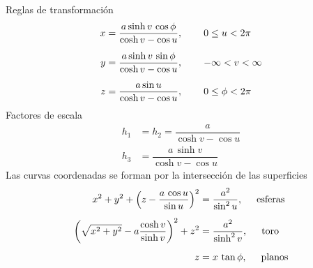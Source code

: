 \documentclass[hidelinks,12pt]{article}
\begin{document}
Reglas de transformación
\begin{align*}
    x &= \dfrac{a \sinh v \, \cos \phi}{\cosh v - \cos u}, \hspace{0.75cm} 0 \leq u < 2 \pi \\[0.5em]
    y &= \dfrac{a \sinh v \, \sin \phi}{\cosh v - \cos u}, \hspace{0.75cm} -\infty < v < \infty \\[0.5em]
    z &= \dfrac{a \sin u}{\cosh v - \cos u}, \hspace{0.75cm} 0 \leq \phi < 2 \pi
\end{align*}
Factores de escala
\begin{align*}
    h_{1} &= h_{2} = \dfrac{a}{\cosh v - \cos u} \\[0.5em]
    h_{3} &= \dfrac{a \, \sinh v}{\cosh v - \cos u}
\end{align*}
Las curvas coordenadas se forman por la intersección de las superficies
\begin{align*}
    x^{2} + y^{2} + \left( z - \dfrac{a \, \cos u}{\sin u} \right)^{2} &= \dfrac{a^{2}}{\sin^{2} u}, \hspace{0.5cm} \text{esferas} \\[0.5em]
    \left( \sqrt{x^{2} + y^{2}} - a \dfrac{\cosh v}{\sinh v} \right)^{2} + z^{2} &= \dfrac{a^{2}}{\sinh^{2} v}, \hspace{0.5cm} \text{toro} \\[0.5em]
    z &= x \, \tan \phi, \hspace{0.5cm} \text{planos}
\end{align*}
\end{document}
